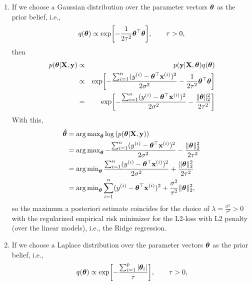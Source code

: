 \documentclass[a4paper]{article}
\begin{document}
{\begin{enumerate}
\begin{align*}
%		
		&= \argmax_{\thetab} -\frac{ \sum_{i=1}^n (\yi - \thetab^\top \xi)^2}{2\sigma^2} \\
%		
		&= \argmin_{\thetab}  \frac{ \sum_{i=1}^n (\yi - \thetab^\top \xi)^2}{2\sigma^2} \\
%		
		&= \argmin_{\thetab}  \sum_{i=1}^n (\yi - \thetab^\top \xi)^2, \tag{$2\sigma^2$ is just a constant scaling}
%		
	\end{align*}
%
	so the  maximum a posteriori estimate coincides with the empirical risk minimizer for the L2-loss (over the linear models).
%
  \item If we choose a Gaussian distribution over the parameter vectors $\bm{\theta}$ as the prior belief, i.e.,
  $$  q(\bm{\theta})  \propto  \exp\biggl[ -\frac{1}{2\tau^2}\bm{\theta}^\top\bm{\theta}  \biggr], \qquad \tau>0, $$
  	then 
%  
  \begin{eqnarray*}
%  	
  	p(\thetab | \Xmat, \yv) &\propto& p(\yv | \Xmat, \thetab) q(\thetab) \\
  	&\propto& \exp\biggl[-\frac{ \sum_{i=1}^n (\yi - \thetab^\top \xi)^2}{2\sigma^2} -\frac{1}{2\tau^2}\thetab^\top\thetab \biggr] \\
%  	
	&=& \exp\biggl[-\frac{ \sum_{i=1}^n (\yi - \thetab^\top \xi)^2}{2\sigma^2} -\frac{\|\thetab\|_2^2}{2\tau^2}  \biggr]
  \end{eqnarray*}
  With this, 
  \begin{align*}
  	\thetabh 
  	&= \argmax_{\thetab} \log \left( p(\thetab | \Xmat, \yv) \right) \\
  	&= \argmax_{\thetab} -\frac{ \sum_{i=1}^n (\yi - \thetab^\top \xi)^2}{2\sigma^2} -\frac{\|\thetab\|_2^2}{2\tau^2}   \\
  	&= \argmin_{\thetab}  \frac{ \sum_{i=1}^n (\yi - \thetab^\top \xi)^2}{2\sigma^2} + \frac{\|\thetab\|_2^2}{2\tau^2}   \\
%  	
  	&= \argmin_{\thetab}   \sum_{i=1}^n (\yi - \thetab^\top \xi)^2  + \frac{\sigma^2}{ \tau^2}  \|\thetab\|_2^2   ,
  \end{align*}
  so the  maximum a posteriori estimate coincides for the choice of $\lambda = \frac{\sigma^2}{ \tau^2}>0$ with the regularized empirical risk minimizer for the L2-loss with L2 penalty (over the linear models), i.e., the Ridge regression.
%  
  \item If we choose a Laplace distribution over the parameter vectors $\bm{\theta}$ as the prior belief, i.e.,
%  
	$$  q(\bm{\theta})  \propto  \exp\biggl[-\frac{\sum_{i=1}^p |\bm{\theta}_i|}{\tau} \biggr], \qquad \tau>0, $$

\end{enumerate}}
\end{document}

